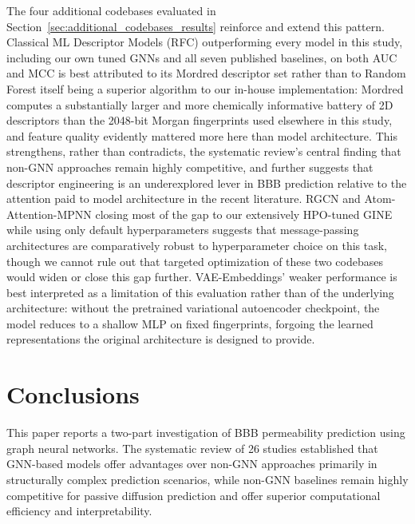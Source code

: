 \documentclass[conference]{IEEEtran}
\begin{document}
The four additional codebases evaluated in
Section~\ref{sec:additional_codebases_results} reinforce and
extend this pattern. Classical ML Descriptor Models (RFC) outperforming every model in
this study, including our own tuned GNNs and all seven published
baselines, on both AUC and MCC is best attributed to its Mordred
descriptor set rather than to Random Forest itself being a superior
algorithm to our in-house implementation: Mordred computes a
substantially larger and more chemically informative battery of 2D
descriptors than the 2048-bit Morgan fingerprints used elsewhere in
this study, and feature quality evidently mattered more here than
model architecture. This strengthens, rather than contradicts, the
systematic review's central finding that non-GNN approaches remain
highly competitive, and further suggests that descriptor engineering
is an underexplored lever in BBB prediction relative to the attention
paid to model architecture in the recent literature. RGCN and
Atom-Attention-MPNN closing most of the gap to our extensively
HPO-tuned GINE while using only default hyperparameters suggests that
message-passing architectures are comparatively robust to
hyperparameter choice on this task, though we cannot rule out that
targeted optimization of these two codebases would widen or close this
gap further. VAE-Embeddings' weaker performance is best interpreted as
a limitation of this evaluation rather than of the underlying
architecture: without the pretrained variational autoencoder
checkpoint, the model reduces to a shallow MLP on fixed fingerprints,
forgoing the learned representations the original architecture is
designed to provide.

\section{Conclusions}

This paper reports a two-part investigation of BBB permeability prediction using graph neural networks. The systematic review of 26 studies established that GNN-based models offer advantages over non-GNN approaches primarily in structurally complex prediction scenarios, while non-GNN baselines remain highly competitive for passive diffusion prediction and offer superior computational efficiency and interpretability.
\end{document}
